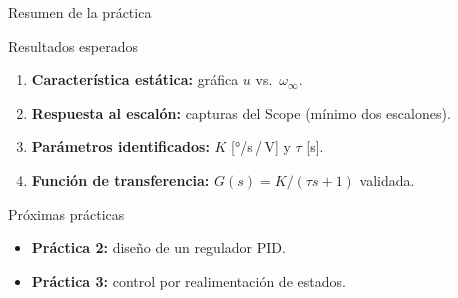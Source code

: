 \documentclass{beamer}
\begin{document}
\begin{frame}{Resumen de la práctica}
\begin{block}{Resultados esperados}
  \begin{enumerate}
    \item \textbf{Característica estática:} gráfica $u$ vs.\ $\omega_\infty$.
    \item \textbf{Respuesta al escalón:} capturas del Scope (mínimo dos escalones).
    \item \textbf{Parámetros identificados:} $K$ [°/s\,/\,V] y $\tau$ [s].
    \item \textbf{Función de transferencia:} $G(s) = K/(\tau s+1)$ validada.
  \end{enumerate}
\end{block}
\vspace{4pt}
\begin{block}{Próximas prácticas}
  \begin{itemize}
    \item \textbf{Práctica 2:} diseño de un regulador PID.
    \item \textbf{Práctica 3:} control por realimentación de estados.
  \end{itemize}
\end{block}
\end{frame}
\end{document}
